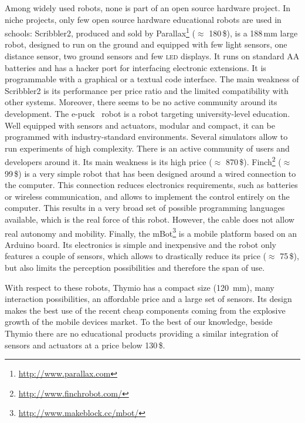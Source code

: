 \documentclass[letterpaper, 10 pt, conference]{ieeeconf}  %
\begin{document}
Among widely used robots, none is part of an open source hardware project.
In niche projects, only few open source hardware educational robots are used in schools:
Scribbler2, produced and sold by Parallax\footnote{\url{http://www.parallax.com}} ($\approx$ 180\,\$), is a 188\,mm large robot, designed to run on the ground and equipped with few light sensors, one distance sensor, two ground sensors and few \textsc{led} displays.
It runs on standard AA batteries and has a hacker port for interfacing electronic extensions.
It is programmable with a graphical or a textual code interface.  
The main weakness of Scribbler2 is its performance per price ratio and the limited compatibility with other systems. 
Moreover, there seems to be no active community around its development.
The e-puck~\cite{mondada2009puck} robot is a robot targeting university-level education.
Well equipped with sensors and actuators, modular and compact, it can be programmed with industry-standard environments.
Several simulators allow to run experiments of high complexity. 
There is an active community of users and developers around it.
Its main weakness is its high price ($\approx$ 870\,\$).
Finch\footnote{\url{http://www.finchrobot.com/}} ($\approx$ 99\,\$) is a very simple robot that has been designed around a wired connection to the computer. 
This connection reduces electronics requirements, such as batteries or wireless communication, and allows to implement the control entirely on the computer.
This results in a very broad set of possible programming languages available, which is the real force of this robot. 
However, the cable does not allow real autonomy and mobility.
Finally, the mBot\footnote{\url{http://www.makeblock.cc/mbot/}} is a mobile platform based on an Arduino board.
Its electronics is simple and inexpensive and the robot only features a couple of sensors, which allows to drastically reduce its price ($\approx$ 75\,\$), but also limits the perception possibilities and therefore the span of use.

With respect to these robots, Thymio has a compact size (120~mm), many interaction possibilities, an affordable price and a large set of sensors.
Its design makes the best use of the recent cheap components coming from the explosive growth of the mobile devices market. 
To the best of our knowledge, beside Thymio there are no educational products providing a similar integration of sensors and actuators at a price below 130\,\$.
\end{document}
